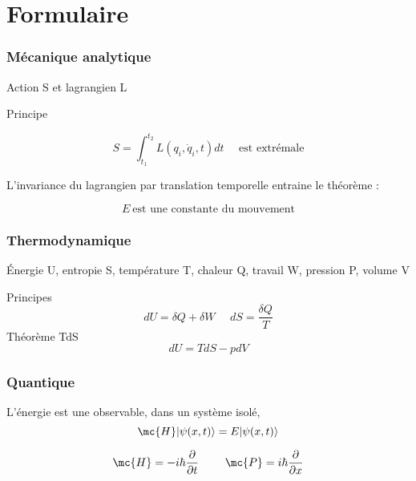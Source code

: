 \chapter{Formulaire}
\subsection{Mécanique analytique}

Action S et lagrangien L

Principe

\[
S = \int_{t_1}^{t_2} L(q_i, \dot{q}_i, t)dt \ \ \ \ \ \ \text{est extrémale}
\]

L'invariance du lagrangien par translation temporelle entraine le théorème :

\[
E \ \text{est une constante du mouvement}
\]

\subsection{Thermodynamique}

Énergie U, entropie S, température T, chaleur Q, travail W,  pression P, volume V

Principes
\[
dU = \delta Q + \delta W \ \ \ \ \ \ dS = \frac{\delta Q}{T}
\]
Théorème TdS
\[
dU = TdS - pdV
\]

\subsection{Quantique}
L'énergie est une observable, dans un système isolé,
\[
\mc{H}|\psi(x,t)\rangle=E|\psi(x,t)\rangle
\]


\[
\mc{H} = -i\hbar\frac{\partial}{\partial t} \ \ \ \ \ \ \ \mc{P} = i\hbar\frac{\partial}{\partial x}
\]
